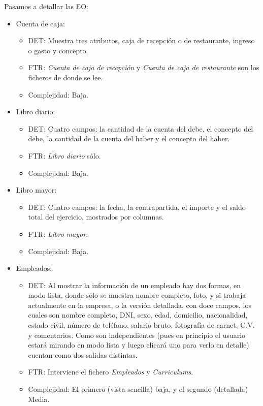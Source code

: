 \documentclass[spanish,a4paper,12pt]{report}	%
\begin{document}
	Pasamos a detallar las EO:
	\begin{itemize}
		\item{Cuenta de caja:} 
		\begin{itemize}
 			\item{DET:} Muestra tres atributos, caja de recepción o de restaurante, ingreso o gasto y concepto.
			\item{FTR:} \textit{Cuenta de caja de recepción} y \textit{Cuenta de caja de restaurante} son los ficheros de donde se lee.
			\item{Complejidad:} Baja.
		\end{itemize}
		\item{Libro diario:} 
		\begin{itemize}
 			\item{DET:} Cuatro campos: la cantidad de la cuenta del debe, el concepto del debe, la cantidad de la cuenta del haber y el concepto del haber.
			\item{FTR:} \textit{Libro diario} sólo.
			\item{Complejidad:} Baja.
		\end{itemize}
		\item{Libro mayor:} 
		\begin{itemize}
 			\item{DET:} Cuatro campos: la fecha, la contrapartida, el importe y el saldo total del ejercicio, mostrados por columnas.
			\item{FTR:} \textit{Libro mayor}.
			\item{Complejidad:} Baja.
		\end{itemize}
		\item{Empleados:} 
		\begin{itemize}
 			\item{DET:} Al mostrar la información de un empleado hay dos formas, en modo lista, donde sólo se muestra nombre completo, foto, y si trabaja actualmente en la empresa, o la versión detallada, con doce campos, los cuales son nombre completo, DNI, sexo, edad, domicilio, nacionalidad, estado civil, número de teléfono, salario bruto, fotografía de carnet, C.V. y comentarios. Como son independientes (pues en principio el usuario estará mirando en modo lista y luego clicará uno para verlo en detalle) cuentan como dos salidas distintas.
			\item{FTR:} Interviene el fichero \textit{Empleados} y \textit{Curriculums}.
			\item{Complejidad:} El primero (vista sencilla) baja, y el segundo (detallada) Media.

\end{itemize}
\end{itemize}
\end{document}

